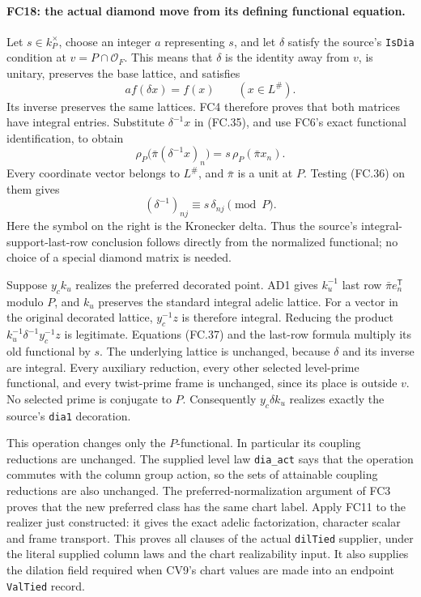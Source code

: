 \paragraph{FC18: the actual diamond move from its defining functional
equation.}
Let $s\in k_P^\times$, choose an integer $a$ representing $s$,
and let $\delta$ satisfy the source's \texttt{IsDia} condition at
$v=P\cap\mathcal O_F$. This means that $\delta$ is the identity
away from $v$, is unitary, preserves the base lattice, and satisfies
\[
             a f(\delta x)=f(x)\qquad(x\in L^\#).
 \tag{FC.35}
\]
Its inverse preserves the same lattices. FC4 therefore proves that
both matrices have integral entries. Substitute $\delta^{-1}x$
in (FC.35), and use FC6's exact functional identification, to obtain
\[
 \rho_P\bigl(\bar\pi(\delta^{-1}x)_n\bigr)
                =s\,\rho_P(\bar\pi x_n).
 \tag{FC.36}
\]
Every coordinate vector belongs to $L^\#$, and $\bar\pi$ is a
unit at $P$. Testing (FC.36) on them gives
\[
        (\delta^{-1})_{nj}\equiv s\,\delta_{nj}\pmod P.
 \tag{FC.37}
\]
Here the symbol on the right is the Kronecker delta.
Thus the source's integral-support-last-row conclusion follows directly
from the normalized functional; no choice of a special diamond matrix
is needed.

Suppose $y_ck_u$ realizes the preferred decorated point. AD1 gives
$k_u^{-1}$ last row $\bar\pi e_n^{\mathsf T}$ modulo $P$,
and $k_u$ preserves the standard integral adelic lattice.
For a vector in the original decorated lattice, $y_c^{-1}z$ is
therefore integral. Reducing the product
$k_u^{-1}\delta^{-1}y_c^{-1}z$ is legitimate. Equations (FC.37)
and the last-row formula multiply its old functional by $s$.
The underlying lattice is unchanged, because $\delta$ and its inverse
are integral. Every auxiliary reduction, every other selected level-prime
functional, and every twist-prime frame is unchanged, since its place
is outside $v$. No selected prime is conjugate to $P$.
Consequently $y_c\delta k_u$ realizes exactly the source's
\texttt{dia1} decoration.

This operation changes only the $P$-functional. In particular its
coupling reductions are unchanged. The supplied level law
\texttt{dia\_act} says that the operation commutes with the column
group action, so the sets of attainable coupling reductions are also
unchanged. The preferred-normalization argument of FC3 proves that the
new preferred class has the same chart label. Apply FC11 to the
realizer just constructed: it gives the exact adelic factorization,
character scalar and frame transport. This proves all clauses of the
actual \texttt{dilTied} supplier, under the literal supplied column
laws and the chart realizability input. It also supplies the dilation
field required when CV9's chart values are made into an endpoint
\texttt{ValTied} record.

